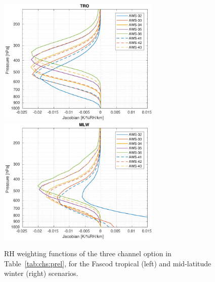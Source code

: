 \documentclass[12pt]{article}
\begin{document}
\begin{figure}[!p]
  \centering
  \includegraphics[height=61mm]{fascod_3chopt_tro}\hspace{5mm}%
  \includegraphics[clip,trim=43 0 0 0,height=61mm]{fascod_3chopt_mlw}
  \caption{RH weighting functions of the three channel option in
    Table~\ref{tab:chs:prel}, for the Fascod tropical (left) and mid-latitude
    winter (right) scenarios.}
  \label{fig:3ch:prel}
\end{figure}
\end{document}
